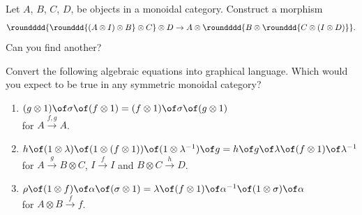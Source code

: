 \def\pathToRoot{../../}

\graphicspath{{graphics/}}



\author{Felix Rech}


\begin{exercise}
  Let $A$, $B$, $C$, $D$, be objects in a monoidal category.
  Construct a morphism
  \[
    \roundddd{\rounddd{(A \otimes I) \otimes B} \otimes C} \otimes D
    \to A \otimes \roundddd{B \otimes \rounddd{C \otimes (I \otimes D)}}.
  \]
  Can you find another?
\end{exercise}


\begin{exercise}
  Convert the following algebraic equations into graphical language.
  Which would you expect to be true in any symmetric monoidal category?
  \begin{enumerate}
    \item
      $(g \otimes 1) \of \sigma \of (f \otimes 1)
        = (f \otimes 1) \of \sigma \of (g \otimes 1)$ \\
      for $A \xrightarrow{f, g} A$.

    \item
      $h \of (1 \otimes \lambda) \of (1 \otimes (f \otimes 1)) \of (1 \otimes \lambda^{-1}) \of g
        = h \of g \of \lambda \of (f \otimes 1) \of \lambda^{-1}$ \\
      for $A \xrightarrow{g} B \otimes C$, $I \xrightarrow{f} I$ and $B \otimes C \xrightarrow{h} D$.

    \item
      $\rho \of (1 \otimes f) \of \alpha \of (\sigma \otimes 1)
        = \lambda \of (f \otimes 1) \of \alpha^{-1} \of (1 \otimes \sigma) \of \alpha$ \\
      for $A \otimes B \xrightarrow{f} f$.
  \end{enumerate}
\end{exercise}


